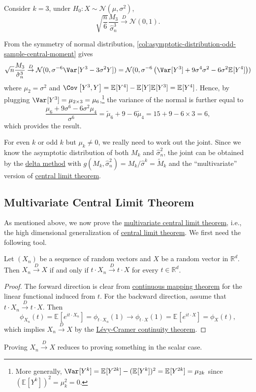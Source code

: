 \begin{eg}
	Consider \(k = 3\), under \(H_0 \colon X \sim \mathcal{N} (\mu , \sigma ^2)\),
	\[
		\sqrt{\frac{n}{6}} \frac{M_3}{\hat{\sigma} _n^3}
		\overset{D}{\to} \mathcal{N} (0, 1).
	\]
\end{eg}
\begin{explanation}
	From the symmetry of normal distribution, \autoref{col:asymptotic-distribution-odd-sample-central-moment} gives
	\[
		\sqrt{n} \frac{M_3}{\hat{\sigma} _n^3}
		\overset{D}{\to} \mathcal{N} (0, \sigma ^{-6} \Var_{}[Y^3 - 3 \sigma ^2 Y] )
		= \mathcal{N} (0, \sigma ^{-6} \left( \Var_{}[Y^3] + 9 \sigma ^4 \sigma ^2 - 6 \sigma ^2 \mathbb{E}_{}[Y^4] \right) )
	\]
	where  \(\mu _2 = \sigma ^2\) and \(\Cov_{}\left[Y^3 , Y\right] = \mathbb{E}_{}[Y^4] - \mathbb{E}_{}[Y] \mathbb{E}_{}[Y^3] = \mathbb{E}_{}[Y^4] \). Hence, by plugging \(\Var_{}[Y^3] = \mu _{2 \times 3} = \mu _6\),\footnote{More generally, \(\Var_{}[Y^k] = \mathbb{E}_{}[Y^{2k} ] - (\mathbb{E}_{}[Y^k] )^2 = \mathbb{E}_{}[Y^{2k} ] = \mu _{2k}\) since \((\mathbb{E}_{}[Y^k] )^2 = \mu _k^2 = 0\).} the variance of the normal is further equal to
	\[
		\frac{\mu _6 + 9 \sigma ^6 - 6 \sigma ^2 \mu _4}{\sigma ^6}
		= \widetilde{\mu} _6 + 9 - 6 \widetilde{\mu} _4
		= 15 + 9 - 6 \times 3
		= 6,
	\]
	which provides the result.
\end{explanation}

For even \(k\) or odd \(k\) but \(\mu _k \neq 0\), we really need to work out the joint. Since we know the asymptotic distribution of both \(M_k\) and \(\hat{\sigma} _n^2\), the joint can be obtained by the \hyperref[thm:delta-method]{delta method} with \(g(M_k , \hat{\sigma} _n^2) = M_k / \hat{\sigma} ^k = \widetilde{M} _k\) and the ``multivariate'' version of \hyperref[thm:CLT]{central limit theorem}.

\subsection{Multivariate Central Limit Theorem}
As mentioned above, we now prove the \hyperref[thm:multivariate-CLT]{multivariate central limit theorem}, i.e., the high dimensional generalization of \hyperref[thm:CLT]{central limit theorem}. We first need the following tool.

\begin{theorem}\label{thm:Cramer-Wold-device}
	Let \((X_n)\) be a sequence of random vectors and \(X\) be a random vector in \(\mathbb{R} ^d\). Then \(X_n \overset{D}{\to} X\) if and only if \(t \cdot X_n \overset{D}{\to} t \cdot X\) for every \(t \in \mathbb{R} ^d\).
\end{theorem}
\begin{proof}
	The forward direction is clear from \hyperref[thm:continuous-mapping]{continuous mapping theorem} for the linear functional induced from \(t\). For the backward direction, assume that \(t \cdot X_n \overset{D}{\to} t \cdot X\). Then
	\[
		\phi _{X_n}(t)
		= \mathbb{E}_{}[e^{i t \cdot X_n}]
		= \phi _{t \cdot X_n}(1)
		\to \phi _{t \cdot X}(1)
		= \mathbb{E}_{}[e^{i t \cdot X}]
		= \phi _X(t),
	\]
	which implies \(X_n \overset{D}{\to} X\) by the \hyperref[thm:Levy-Cramer-continuity]{Lévy-Cramer continuity theorem}.
\end{proof}

\begin{remark}
	Proving \(X_n \overset{D}{\to} X\) reduces to proving something in the scalar case.
\end{remark}